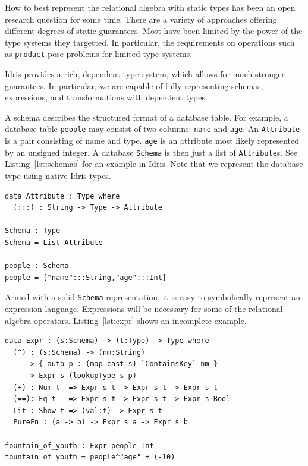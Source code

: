 \documentclass[12pt]{article}
\begin{document}
How to best represent the relational algebra with static types has been an open research question for some time.
There are a variety of approaches offering different degrees of static guarantees.
Most have been limited by the power of the type systems they targetted.
In particular, the requirements on operations such as \texttt{product} pose problems for limited type systems.

Idris provides a rich, dependent-type system, which allows for much stronger guarantees.
In particular, we are capable of fully representing schemas, expressions, and transformations with dependent types.

A schema describes the structured format of a database table.
For example, a database table \texttt{people} may consist of two columns: \texttt{name} and \texttt{age}.
An \texttt{Attribute} is a pair consisting of name and type.
\texttt{age} is an attribute most likely represented by an unsigned integer.
A database \texttt{Schema} is then just a list of \texttt{Attribute}s.
See Listing~\ref{lst:schemas} for an example in Idris.
Note that we represent the database type using native Idris types.

\begin{lstlisting}[label={lst:schemas},caption=Representing schemas with dependent types]
data Attribute : Type where
  (:::) : String -> Type -> Attribute

Schema : Type
Schema = List Attribute

people : Schema
people = ["name":::String,"age":::Int]
\end{lstlisting}

Armed with a solid \texttt{Schema} representation, it is easy to symbolically represent an expression language.
Expressions will be necessary for some of the relational algebra operators.
Listing~\ref{lst:expr} shows an incomplete example.

\begin{lstlisting}[label={lst:expr},caption=Representing typed expressions]
data Expr : (s:Schema) -> (t:Type) -> Type where
  (^) : (s:Schema) -> (nm:String)
     -> { auto p : (map cast s) `ContainsKey` nm }
     -> Expr s (lookupType s p)
  (+) : Num t  => Expr s t -> Expr s t -> Expr s t
  (==): Eq t   => Expr s t -> Expr s t -> Expr s Bool
  Lit : Show t => (val:t) -> Expr s t
  PureFn : (a -> b) -> Expr s a -> Expr s b

fountain_of_youth : Expr people Int
fountain_of_youth = people^"age" + (-10)
\end{lstlisting}
\end{document}
